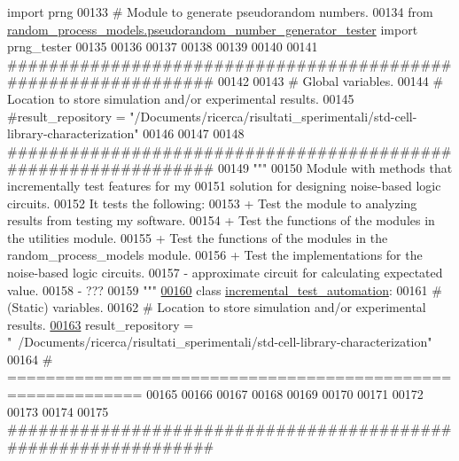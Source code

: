 \begin{DoxyCode}
       \textcolor{keyword}{import} prng
00133 \textcolor{comment}{# Module to generate pseudorandom numbers.}
00134 \textcolor{keyword}{from} \hyperlink{namespacerandom__process__models_1_1pseudorandom__number__generator__tester}{random\_process\_models.pseudorandom\_number\_generator\_tester}
       \textcolor{keyword}{import} prng\_tester
00135 
00136 
00137 
00138 
00139 
00140 
00141 \textcolor{comment}{###############################################################}
00142 
00143 \textcolor{comment}{# Global variables.}
00144 \textcolor{comment}{#   Location to store simulation and/or experimental results.}
00145 \textcolor{comment}{#result\_repository = "/Documents/ricerca/risultati\_sperimentali/std-cell-library-characterization"}
00146 
00147 
00148 \textcolor{comment}{###############################################################}
00149 \textcolor{stringliteral}{"""}
00150 \textcolor{stringliteral}{    Module with methods that incrementally test features for my}
00151 \textcolor{stringliteral}{        solution for designing noise-based logic circuits.}
00152 \textcolor{stringliteral}{    It tests the following:}
00153 \textcolor{stringliteral}{    + Test the module to analyzing results from testing my software.}
00154 \textcolor{stringliteral}{    + Test the functions of the modules in the utilities module.}
00155 \textcolor{stringliteral}{    + Test the functions of the modules in the random\_process\_models module.}
00156 \textcolor{stringliteral}{    + Test the implementations for the noise-based logic circuits.}
00157 \textcolor{stringliteral}{        - approximate circuit for calculating expectated value.}
00158 \textcolor{stringliteral}{        - ???}
00159 \textcolor{stringliteral}{"""}
\hypertarget{incremental__test_8py_source_l00160}{}\hyperlink{classincremental__test_1_1incremental__test__automation}{00160} \textcolor{keyword}{class }\hyperlink{classincremental__test_1_1incremental__test__automation}{incremental\_test\_automation}:
00161     \textcolor{comment}{# (Static) variables.}
00162     \textcolor{comment}{#   Location to store simulation and/or experimental results.}
\hypertarget{incremental__test_8py_source_l00163}{}\hyperlink{classincremental__test_1_1incremental__test__automation_afbbdcc0177de0d7d04bbf38ea90e9a5a}{00163}     result\_repository = \textcolor{stringliteral}{"~/Documents/ricerca/risultati\_sperimentali/std-cell-library-characterization"}
00164     \textcolor{comment}{# ============================================================}
00165 
00166 
00167 
00168 
00169 
00170 
00171 
00172 
00173 
00174 
00175 \textcolor{comment}{###############################################################}

\end{DoxyCode}
